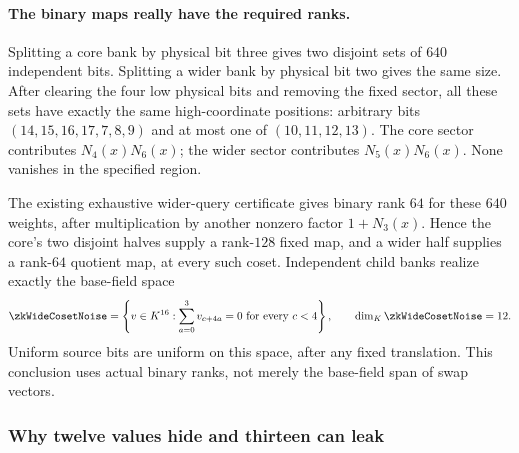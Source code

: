 \paragraph{The binary maps really have the required ranks.} Splitting a core bank by physical bit three gives two disjoint sets of $640$ independent bits. Splitting a wider bank by physical bit two gives the same size. After clearing the four low physical bits and removing the fixed sector, all these sets have exactly the same high-coordinate positions: arbitrary bits $(14,15,16,17,7,8,9)$ and at most one of $(10,11,12,13)$. The core sector contributes $N_4(x)N_6(x)$; the wider sector contributes $N_5(x)N_6(x)$. None vanishes in the specified region.

The existing exhaustive wider-query certificate gives binary rank $64$ for these $640$ weights, after multiplication by another nonzero factor $1+N_3(x)$. Hence the core's two disjoint halves supply a rank-$128$ fixed map, and a wider half supplies a rank-$64$ quotient map, at every such coset. Independent child banks realize exactly the base-field space
\[
 \zkWideCosetNoise
 =\left\{v\in\K^{16}:\sum_{a=0}^3v_{c+4a}=0\ \text{for every }c<4\right\},
 \qquad \dim_{\K}\zkWideCosetNoise=12.
\]
Uniform source bits are uniform on this space, after any fixed translation. This conclusion uses actual binary ranks, not merely the base-field span of swap vectors.

\subsubsection{Why twelve values hide and thirteen can leak}

